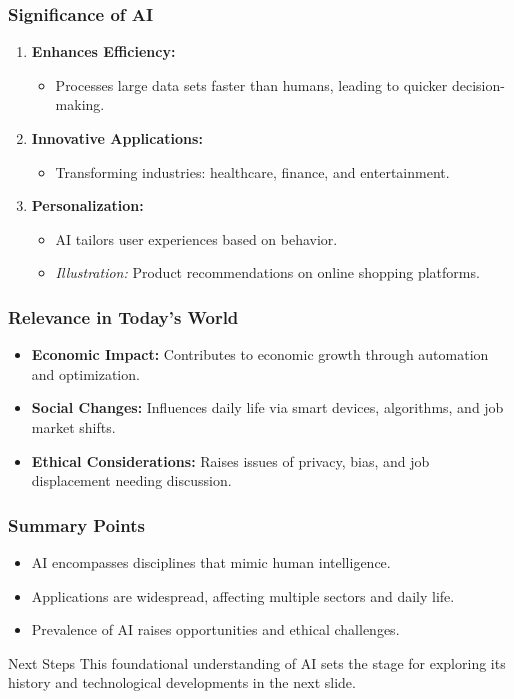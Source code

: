 \documentclass{beamer}
\begin{document}
\begin{frame}[fragile]
    \frametitle{Significance of AI}
    \begin{enumerate}
        \item \textbf{Enhances Efficiency:}
        \begin{itemize}
            \item Processes large data sets faster than humans, leading to quicker decision-making.
        \end{itemize}
        
        \item \textbf{Innovative Applications:}
        \begin{itemize}
            \item Transforming industries: healthcare, finance, and entertainment.
        \end{itemize}
        
        \item \textbf{Personalization:}
        \begin{itemize}
            \item AI tailors user experiences based on behavior.
            \item \textit{Illustration:} Product recommendations on online shopping platforms.
        \end{itemize}
    \end{enumerate}
\end{frame}

\begin{frame}[fragile]
    \frametitle{Relevance in Today's World}
    \begin{itemize}
        \item \textbf{Economic Impact:} Contributes to economic growth through automation and optimization.
        \item \textbf{Social Changes:} Influences daily life via smart devices, algorithms, and job market shifts.
        \item \textbf{Ethical Considerations:} Raises issues of privacy, bias, and job displacement needing discussion.
    \end{itemize}
\end{frame}

\begin{frame}[fragile]
    \frametitle{Summary Points}
    \begin{itemize}
        \item AI encompasses disciplines that mimic human intelligence.
        \item Applications are widespread, affecting multiple sectors and daily life.
        \item Prevalence of AI raises opportunities and ethical challenges.
    \end{itemize}
    \begin{block}{Next Steps}
        This foundational understanding of AI sets the stage for exploring its history and technological developments in the next slide.
    \end{block}
\end{frame}
\end{document}
